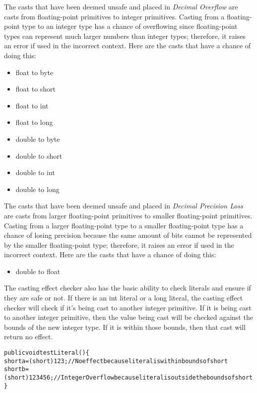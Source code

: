 \noindent
The casts that have been deemed unsafe and placed in \emph{Decimal Overflow} are casts from floating-point primitives to integer primitives. Casting from a floating-point type to an integer type has a chance of overflowing since floating-point types can represent much larger numbers than integer types; therefore, it raises an error if used in the incorrect context. Here are the casts that have a chance of doing this:
\begin{itemize}
\item
float to byte
\item
float to short
\item
float to int
\item
float to long
\item
double to byte
\item
double to short
\item
double to int
\item
double to long
\end{itemize}

The casts that have been deemed unsafe and placed in \emph{Decimal Precision Loss} are casts from larger floating-point primitives to smaller floating-point primitives. Casting from a larger floating-point type to a smaller floating-point type has a chance of losing precision because the same amount of bits cannot be represented by the smaller floating-point type; therefore, it raises an error if used in the incorrect context. Here are the casts that have a chance of doing this:
\begin{itemize}
\item
double to float
\end{itemize}

The casting effect checker also has the basic ability to check literals and ensure if they are safe or not. If there is an int literal or a long literal, the casting effect checker will check if it's being cast to another integer primitive. If it is being cast to another integer primitive, then the value being cast will be checked against the bounds of the new integer type. If it is within those bounds, then that cast will return no effect.

\begin{alltt}
public void testLiteral() \{
    short a = (short) 123; //No effect because literal is within bounds of short
    short b = (short) 123456; //IntegerOverflow because literal is outside the bounds of short
\}
\end{alltt}

